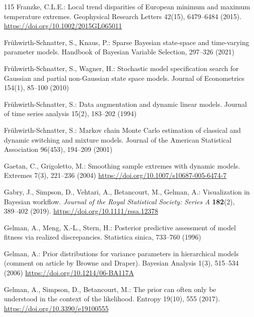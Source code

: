 \documentclass[11pt,a4paper]{article}
\begin{document}
\begin{thebibliography}{115}
		Franzke, C.L.E.: Local trend disparities of European minimum and maximum temperature extremes. Geophysical Research Letters 42(15), 6479--6484 (2015).
		\url{https://doi.org/10.1002/2015GL065011}
		
		Frühwirth-Schnatter, S., Knaus, P.: Sparse Bayesian state-space and time-varying parameter models. Handbook of Bayesian Variable Selection, 297--326 (2021)
		
		Frühwirth-Schnatter, S., Wagner, H.: Stochastic model specification search for Gaussian and partial non-Gaussian state space models. Journal of Econometrics 154(1), 85--100 (2010)
		
		Frühwirth-Schnatter, S.: Data augmentation and dynamic linear models. Journal of time series analysis 15(2), 183--202 (1994)
		
		Frühwirth-Schnatter, S.: Markov chain Monte Carlo estimation of classical and dynamic switching and mixture models. Journal of the American Statistical Association 96(453), 194--209 (2001)
		
		Gaetan, C., Grigoletto, M.: Smoothing sample extremes with dynamic models. Extremes 7(3), 221--236 (2004) \url{https://doi.org/10.1007/s10687-005-6474-7}
		
		Gabry, J., Simpson, D., Vehtari, A., Betancourt, M., Gelman, A.:
		Visualization in Bayesian workflow.
		\textit{Journal of the Royal Statistical Society: Series A}
		\textbf{182}(2), 389--402 (2019).
		\url{https://doi.org/10.1111/rssa.12378}
		
		Gelman, A., Meng, X.-L., Stern, H.: Posterior predictive assessment of model fitness via realized discrepancies. Statistica sinica, 733--760 (1996)
		
		Gelman, A.: Prior distributions for variance parameters in hierarchical models (comment on article by Browne and Draper). Bayesian Analysis 1(3), 515--534 (2006) \url{https://doi.org/10.1214/06-BA117A}
		
        Gelman, A., Simpson, D., Betancourt, M.: The prior can often only be
        understood in the context of the likelihood. Entropy 19(10), 555
        (2017). \url{https://doi.org/10.3390/e19100555}


\end{thebibliography}
\end{document}
